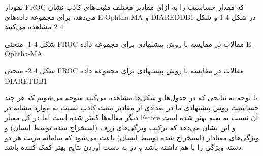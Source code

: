 نمودار FROC که مقدار حساسیت را به ازای مقادیر مختلف مثبت‌های کاذب نشان می‌دهد، برای مجموعه داده‌های E-Ophtha-MA و DIAREDDB1 در شکل ‏4 1 و شکل ‏4 2 مشاهده می‌کنید.

شکل ‏4 1- منحنی FROC مقالات در مقایسه با روش پیشنهادی برای مجموعه داده E-Ophtha-MA
 
شکل ‏4 2- منحنی FROC مقالات در مقایسه با روش پیشنهادی برای مجموعه داده DIARETDB1

با توجه به نتایجی که در جدول‌ها و شکل‌ها مشاهده می‌کنید متوجه می‌شویم که هر چند حساسیت روش پیشنهادی ما در تعدادی از مقادیر مثبت کاذب نسبت به موارد مشابه در دیگر مقاله‌ها کمتر شده است اما در کل معیار Fscore آن نسبت به بقیه بهتر شده است و این نشان می‌دهد که ترکیب ویژگی‌های ژرف (استخراج شده توسط انسان) و ویژگی‌های معنادار (استخراج شده توسط انسان) باعث می‌شود که سامانه مزیت هر دو دسته ویژگی را با هم داشته باشد و در به دست آوردن نتایج بهتر کمک کننده باشد.

